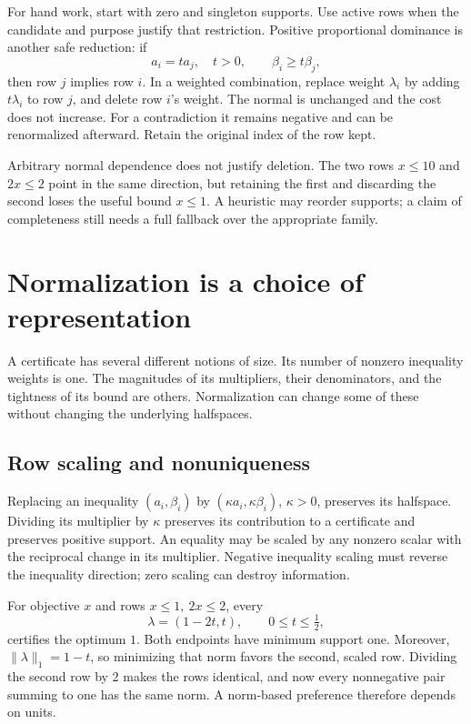 \documentclass[11pt,letterpaper]{article}
\theoremstyle{definition}
\theoremstyle{remark}
\numberwithin{equation}{section}
\begin{document}
For hand work, start with zero and singleton supports. Use active rows when
the candidate and purpose justify that restriction. Positive proportional
dominance is another safe reduction: if
\[
 a_i=t a_j,\quad t>0,\qquad \beta_i\ge t\beta_j,
\]
then row \(j\) implies row \(i\). In a weighted combination, replace weight
\(\lambda_i\) by adding \(t\lambda_i\) to row \(j\), and delete row \(i\)'s
weight. The normal is unchanged and the cost does not increase.
For a contradiction it remains negative and can be renormalized afterward.
Retain the original index of the row kept.

Arbitrary normal dependence does not justify deletion. The two rows
\(x\le10\) and \(2x\le2\) point in the same direction, but retaining the
first and discarding the second loses the useful bound \(x\le1\).
A heuristic may reorder supports; a claim of completeness still needs a
full fallback over the appropriate family.

\section{Normalization is a choice of representation}
\label{sec:normalization}

A certificate has several different notions of size. Its number of
nonzero inequality weights is one. The magnitudes of its multipliers,
their denominators, and the tightness of its bound are others. Normalization
can change some of these without changing the underlying halfspaces.

\subsection{Row scaling and nonuniqueness}

Replacing an inequality \((a_i,\beta_i)\) by
\((\kappa a_i,\kappa\beta_i)\), \(\kappa>0\), preserves its halfspace.
Dividing its multiplier by \(\kappa\) preserves its contribution to a
certificate and preserves positive support. An equality may be scaled by
any nonzero scalar with the reciprocal change in its multiplier.
Negative inequality scaling must reverse the inequality direction; zero
scaling can destroy information.

For objective \(x\) and rows \(x\le1,\ 2x\le2\), every
\[
 \lambda=(1-2t,t),\qquad 0\le t\le\tfrac12,
\]
certifies the optimum \(1\). Both endpoints have minimum support one.
Moreover, \(\|\lambda\|_1=1-t\), so minimizing that norm favors the
second, scaled row. Dividing the second row by \(2\) makes the rows identical,
and now every nonnegative pair summing to one has the same norm.
A norm-based preference therefore depends on units.
\end{document}
